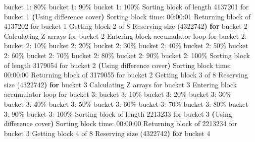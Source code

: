 \documentclass[
  letterpaper,
  DIV=11,
  numbers=noendperiod]{scrartcl}
\newenvironment{Shaded}{\begin{snugshade}}{\end{snugshade}}
\newcommand{\ControlFlowTok}[1]{\textcolor[rgb]{0.00,0.23,0.31}{\textbf{#1}}}
\newcommand{\ErrorTok}[1]{\textcolor[rgb]{0.68,0.00,0.00}{#1}}
\newcommand{\ExtensionTok}[1]{\textcolor[rgb]{0.00,0.23,0.31}{#1}}
\newcommand{\KeywordTok}[1]{\textcolor[rgb]{0.00,0.23,0.31}{\textbf{#1}}}
\newcommand{\NormalTok}[1]{\textcolor[rgb]{0.00,0.23,0.31}{#1}}
\begin{document}
\begin{Shaded}
\begin{Highlighting}[]
  \ExtensionTok{bucket}\NormalTok{ 1: 80\%}
  \ExtensionTok{bucket}\NormalTok{ 1: 90\%}
  \ExtensionTok{bucket}\NormalTok{ 1: 100\%}
  \ExtensionTok{Sorting}\NormalTok{ block of length 4137201 for bucket 1}
  \KeywordTok{(}\ExtensionTok{Using}\NormalTok{ difference cover}\KeywordTok{)}
  \ExtensionTok{Sorting}\NormalTok{ block time: 00:00:01}
\ExtensionTok{Returning}\NormalTok{ block of 4137202 for bucket 1}
\ExtensionTok{Getting}\NormalTok{ block 2 of 8}
  \ExtensionTok{Reserving}\NormalTok{ size }\ErrorTok{(}\ExtensionTok{4322742}\KeywordTok{)} \ControlFlowTok{for}\NormalTok{ bucket }\ExtensionTok{2}
  \ExtensionTok{Calculating}\NormalTok{ Z arrays for bucket 2}
  \ExtensionTok{Entering}\NormalTok{ block accumulator loop for bucket 2:}
  \ExtensionTok{bucket}\NormalTok{ 2: 10\%}
  \ExtensionTok{bucket}\NormalTok{ 2: 20\%}
  \ExtensionTok{bucket}\NormalTok{ 2: 30\%}
  \ExtensionTok{bucket}\NormalTok{ 2: 40\%}
  \ExtensionTok{bucket}\NormalTok{ 2: 50\%}
  \ExtensionTok{bucket}\NormalTok{ 2: 60\%}
  \ExtensionTok{bucket}\NormalTok{ 2: 70\%}
  \ExtensionTok{bucket}\NormalTok{ 2: 80\%}
  \ExtensionTok{bucket}\NormalTok{ 2: 90\%}
  \ExtensionTok{bucket}\NormalTok{ 2: 100\%}
  \ExtensionTok{Sorting}\NormalTok{ block of length 3179054 for bucket 2}
  \KeywordTok{(}\ExtensionTok{Using}\NormalTok{ difference cover}\KeywordTok{)}
  \ExtensionTok{Sorting}\NormalTok{ block time: 00:00:00}
\ExtensionTok{Returning}\NormalTok{ block of 3179055 for bucket 2}
\ExtensionTok{Getting}\NormalTok{ block 3 of 8}
  \ExtensionTok{Reserving}\NormalTok{ size }\ErrorTok{(}\ExtensionTok{4322742}\KeywordTok{)} \ControlFlowTok{for}\NormalTok{ bucket }\ExtensionTok{3}
  \ExtensionTok{Calculating}\NormalTok{ Z arrays for bucket 3}
  \ExtensionTok{Entering}\NormalTok{ block accumulator loop for bucket 3:}
  \ExtensionTok{bucket}\NormalTok{ 3: 10\%}
  \ExtensionTok{bucket}\NormalTok{ 3: 20\%}
  \ExtensionTok{bucket}\NormalTok{ 3: 30\%}
  \ExtensionTok{bucket}\NormalTok{ 3: 40\%}
  \ExtensionTok{bucket}\NormalTok{ 3: 50\%}
  \ExtensionTok{bucket}\NormalTok{ 3: 60\%}
  \ExtensionTok{bucket}\NormalTok{ 3: 70\%}
  \ExtensionTok{bucket}\NormalTok{ 3: 80\%}
  \ExtensionTok{bucket}\NormalTok{ 3: 90\%}
  \ExtensionTok{bucket}\NormalTok{ 3: 100\%}
  \ExtensionTok{Sorting}\NormalTok{ block of length 2213233 for bucket 3}
  \KeywordTok{(}\ExtensionTok{Using}\NormalTok{ difference cover}\KeywordTok{)}
  \ExtensionTok{Sorting}\NormalTok{ block time: 00:00:00}
\ExtensionTok{Returning}\NormalTok{ block of 2213234 for bucket 3}
\ExtensionTok{Getting}\NormalTok{ block 4 of 8}
  \ExtensionTok{Reserving}\NormalTok{ size }\ErrorTok{(}\ExtensionTok{4322742}\KeywordTok{)} \ControlFlowTok{for}\NormalTok{ bucket }\ExtensionTok{4}

\end{Highlighting}
\end{Shaded}
\end{document}

